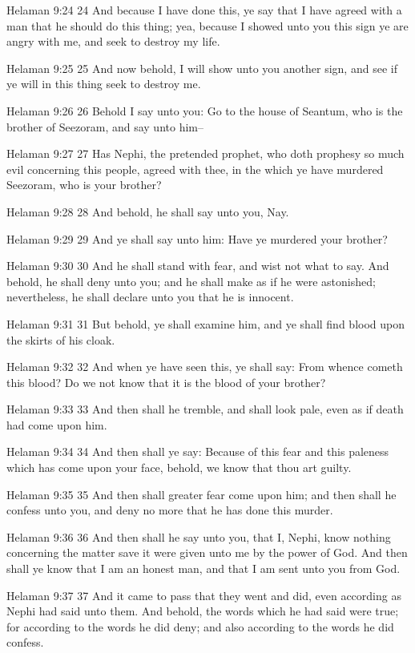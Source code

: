Helaman 9:24
 24 And because I have done this, ye say that I have agreed with
a man that he should do this thing; yea, because I showed unto
you this sign ye are angry with me, and seek to destroy my life.

Helaman 9:25
 25 And now behold, I will show unto you another sign, and see if
ye will in this thing seek to destroy me.

Helaman 9:26
 26 Behold I say unto you: Go to the house of Seantum, who is the
brother of Seezoram, and say unto him--

Helaman 9:27
 27 Has Nephi, the pretended prophet, who doth prophesy so much
evil concerning this people, agreed with thee, in the which ye
have murdered Seezoram, who is your brother?

Helaman 9:28
 28 And behold, he shall say unto you, Nay.

Helaman 9:29
 29 And ye shall say unto him: Have ye murdered your brother?

Helaman 9:30
 30 And he shall stand with fear, and wist not what to say. And
behold, he shall deny unto you; and he shall make as if he were
astonished; nevertheless, he shall declare unto you that he is
innocent.

Helaman 9:31
 31 But behold, ye shall examine him, and ye shall find blood
upon the skirts of his cloak.

Helaman 9:32
 32 And when ye have seen this, ye shall say: From whence cometh
this blood? Do we not know that it is the blood of your brother?

Helaman 9:33
 33 And then shall he tremble, and shall look pale, even as if
death had come upon him.

Helaman 9:34
 34 And then shall ye say: Because of this fear and this paleness
which has come upon your face, behold, we know that thou art
guilty.

Helaman 9:35
 35 And then shall greater fear come upon him; and then shall he
confess unto you, and deny no more that he has done this murder.

Helaman 9:36
 36 And then shall he say unto you, that I, Nephi, know nothing
concerning the matter save it were given unto me by the power of
God. And then shall ye know that I am an honest man, and that I
am sent unto you from God.

Helaman 9:37
 37 And it came to pass that they went and did, even according as
Nephi had said unto them. And behold, the words which he had
said were true; for according to the words he did deny; and also
according to the words he did confess.

